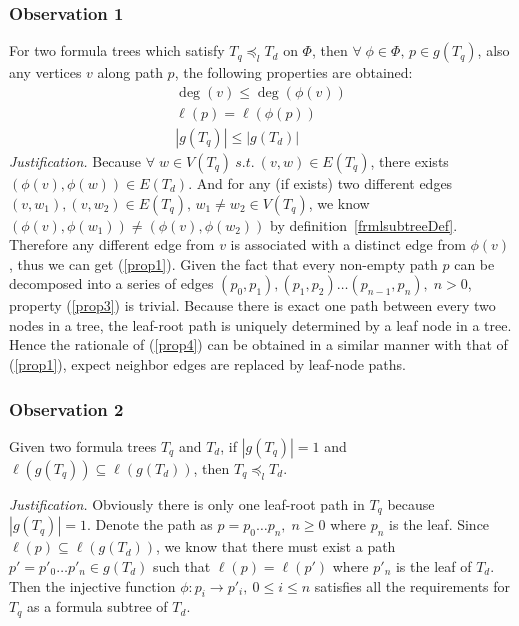 \documentclass{acm_proc_article-sp}
\begin{document}
\subsubsection{Observation 1} 
\label{observation1}
For two formula trees which satisfy $T_q \preceq_l T_d$ on $\Phi$, then $\forall\; \phi \in \Phi,\, p \in g(T_q)$, also any vertices $v$ along path $p$, the following properties are obtained:
\begin{eqnarray}
\deg(v) \le \deg(\phi(v)) \label{prop1} \\
\ell(p) = \ell(\phi(p)) \label{prop3} \\
\left| g(T_q) \right| \le \left| g(T_d) \right| \label{prop4}
\end{eqnarray}
\textit{Justification.} 
Because $\forall\; w \in V(T_q) \  s.t. \  (v, w) \in E(T_q)$, there exists $(\phi(v), \phi(w)) \in E(T_d)$. 
And for any (if exists) two different edges $(v, w_1), (v, w_2) \in E(T_q),\, w_1 \not= w_2 \in V(T_q) $, we know $(\phi(v), \phi(w_1)) \not= (\phi(v), \phi(w_2))$ by definition~\ref{frmlsubtreeDef}. 
Therefore any different edge from $v$ is associated with a distinct edge from $\phi(v)$, thus we can get (\ref{prop1}). 
Given the fact that every non-empty path $p$ can be decomposed into a series of edges $(p_0, p_1), (p_1, p_2) \ldots (p_{n-1}, p_n), \; n > 0$,
property (\ref{prop3}) is trivial.
Because there is exact one path between every two nodes in a tree, the leaf-root path is uniquely determined by a leaf node in a tree. Hence the rationale of (\ref{prop4}) can be obtained in a similar manner with that of (\ref{prop1}), expect neighbor edges are replaced by leaf-node paths.


\subsubsection{Observation 2} 
\label{observation2}
Given two formula trees $T_q$ and $T_d$, if $\left| g(T_q) \right| = 1$ and $\ell(g(T_{q})) \subseteq \ell(g(T_d))$, then $T_q \preceq_l T_d$.

\noindent \textit{Justification.} 
Obviously there is only one leaf-root path in $T_q$ because $\left| g(T_q) \right| = 1$. 
Denote the path as $p = p_0 \ldots p_n,\; n \ge 0$ where $p_n$ is the leaf.
Since $\ell(p) \subseteq \ell(g(T_d))$, we know that there must exist a path $p'=p'_0 \ldots p'_n \in g(T_d)$ such that $\ell(p) = \ell(p')$ 
where $p'_n$ is the leaf of $T_d$.
Then
the injective function $\phi: p_i \rightarrow p'_i,\  0 \le i \le n$ satisfies all the requirements for $T_q$ as a formula subtree of $T_d$.
\end{document}
